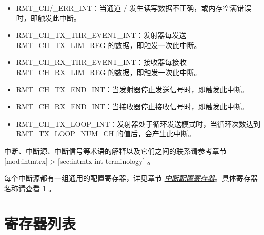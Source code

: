\documentclass[main\_\_CN.tex]{subfiles}
\begin{document}
\begin{itemize}
\item \label{int:RMTCHNERRINT}RMT\_CH/\_ERR\_INT：当通道 / 发生读写数据不正确，或内存空满错误时，即触发此中断。    
\item \label{int:RMTCHNTXTHREVENTINT}RMT\_CH\_TX\_THR\_EVENT\_INT：发射器每发送 \hyperref[regdesc:RMTCHNTXLIMREG]{RMT\_CH\_TX\_LIM\_REG} 的数据，即触发一次此中断。
\item \label{int:RMTCHMRXTHREVENTINT}RMT\_CH\_RX\_THR\_EVENT\_INT：接收器每接收 \hyperref[regdesc:RMTCHMRXLIMREG]{RMT\_CH\_RX\_LIM\_REG} 的数据，即触发一次此中断。
\item \label{int:RMTCHNTXENDINT}RMT\_CH\_TX\_END\_INT：当发射器停止发送信号时，即触发此中断。
\item \label{int:RMTCHMRXENDINT}RMT\_CH\_RX\_END\_INT：当接收器停止接收信号时，即触发此中断。
\item \label{int:RMTCHNTXLOOPINT}RMT\_CH\_TX\_LOOP\_INT：发射器处于循环发送模式时，当循环次数达到 \hyperref[fielddesc:RMTTXLOOPNUMCHN]{RMT\_TX\_LOOP\_NUM\_CH} 的值后，会产生此中断。
\end{itemize}

\begin{tiplisting}
中断、中断源、中断信号等术语的解释以及它们之间的联系请参考章节 \ref{mod:intmtrx} \textit{} > \ref{sec:intmtx-int-terminology} \textit{}。
\end{tiplisting}

每个中断源都有一组通用的配置寄存器，详见章节 \hyperref[interrupt-config-registers]{\textit{中断配置寄存器}}。具体寄存器名称请查看 \ref{sec:rmt-reg-summ} \textit{}。






\newpage
\hypertarget{rmt-reg-summ}{}
\section{寄存器列表}
\label{sec:rmt-reg-summ}
\end{document}
